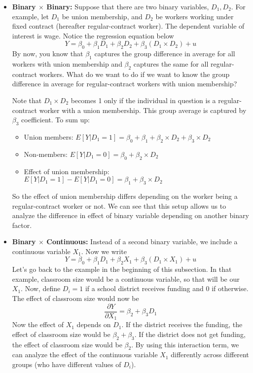 \documentclass[12pt]{article}
\theoremstyle{definition}
\theoremstyle{property}
\theoremstyle{assumption}
\theoremstyle{example}
\theoremstyle{comment}
\begin{document}
\begin{itemize}
\item\textbf{Binary $\times$ Binary: } Suppose that there are two binary variables, $D_1, D_2$. For example, let $D_1$ be union membership, and $D_2$ be workers working under fixed contract (hereafter regular-contract worker). The dependent variable of interest is wage. Notice the regression equation below
\[
Y= \beta_0 + \beta_1 D_1 + \beta_2 D_2 + \beta_3 (D_1 \times D_2) + u
\]  
By now, you know that $\beta_1$ captures the group difference in average for all workers with union membership and $\beta_2$ captures the same for all regular-contract workers. What do we want to do if we want to know the group difference in average for regular-contract workers with union membership? \par 
Note that $D_1 \times D_2$ becomes 1 only if the individual in question is a regular-contract worker with a union membership. This group average is captured by $\beta_3$ coefficient. To sum up:
\begin{itemize}
\item Union members: $E[Y|D_1 = 1] = \beta_0+\beta_1+\beta_2\times D_2+\beta_3\times D_2$
\item Non-members:  $E[Y|D_1 = 0] = \beta_0+\beta_2\times D_2$
\item Effect of union membership: $E[Y|D_1 = 1]-E[Y|D_1 = 0] = \beta_1 + \beta_3\times D_2$
\end{itemize}
So the effect of union membership differs depending on the worker being a regular-contract worker or not. We can see that this setup allows us to analyze the difference in effect of binary variable depending on another binary factor. 
\item \textbf{Binary $\times$ Continuous: } Instead of a second binary variable, we include a continuous variable $X_1$. Now we write
\[
Y= \beta_0 + \beta_1 D_1 + \beta_2 X_1 + \beta_3 (D_1 \times X_1) + u
\]
Let's go back to the example in the beginning of this subsection. In that example, classroom size would be a continuous variable, so that will be our $X_1$. Now, define $D_i=1$ if a school district receives funding and $0$ if otherwise. The effect of classroom size would now be 
\[
\frac{\partial Y}{\partial X_1} = \beta_2 + \beta_3 D_1
\]
Now the effect of $X_1$ depends on $D_1$. If the district receives the funding, the effect of classroom size would be $\beta_2 + \beta_3$. If the district does not get funding, the effect of classroom size would be $\beta_2$. By using this interaction term, we can analyze the effect of the continuous variable $X_1$ differently across different groups (who have different values of $D_i$). 

\end{itemize}
\end{document}
